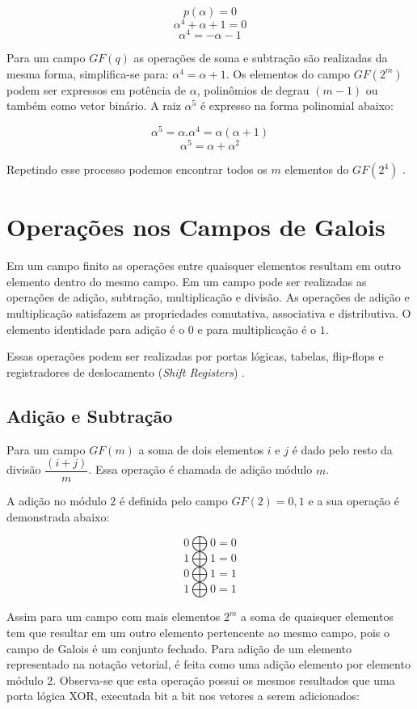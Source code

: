 $$p(\alpha) = 0$$
$$\alpha^{4} + \alpha + 1 = 0$$
$$\alpha^{4} = - \alpha - 1 $$

Para um campo $GF(q)$ as operações de soma e subtração são realizadas da mesma forma, simplifica-se para: $\alpha^{4} = \alpha + 1$. Os elementos do campo $GF(2^{m})$ podem ser expressos em potência de $\alpha$, polinômios de degrau $(m - 1)$ ou também como vetor binário. A raiz $\alpha^{5}$ é expresso na forma polinomial abaixo:

$$\alpha^{5} = \alpha.\alpha^{4} = \alpha(\alpha + 1)$$
$$\alpha^{5} = \alpha + \alpha^{2}$$

Repetindo esse processo podemos encontrar todos os $m$ elementos do $GF(2^{4})$ \cite{John2004}. 

\section{Operações nos Campos de Galois}

Em um campo finito as operações entre quaisquer elementos resultam em outro elemento dentro do mesmo campo. Em um campo pode ser realizadas as operações de adição, subtração, multiplicação e divisão. As operações de adição e multiplicação satisfazem as propriedades comutativa, associativa e distributiva. O elemento identidade para adição é o $0$ e para multiplicação é o $1$.

Essas operações podem ser realizadas por portas lógicas, tabelas, flip-flops e registradores de deslocamento (\textit{Shift Registers}) \cite{John2004}.

\subsection{Adição e Subtração}

Para um campo $GF(m)$ a soma de dois elementos $i$ e $j$ é dado pelo resto da divisão $\dfrac{(i + j)}{m}$. Essa operação é chamada de adição módulo $m$. 

A adição no módulo 2 é definida pelo campo $GF(2) = {0,1}$ e a sua operação é demonstrada abaixo:

$$0 \bigoplus 0 = 0$$
$$1 \bigoplus 1 = 0$$
$$0 \bigoplus 1 = 1$$
$$1 \bigoplus 0 = 1$$

Assim para um campo com mais elementos $2^{m}$ a soma de quaisquer elementos tem que resultar em um outro elemento pertencente ao mesmo campo, pois o campo de Galois é um conjunto fechado. Para adição de um elemento representado na notação vetorial, é feita como uma adição elemento por elemento módulo 2. Observa-se que esta operação possui os mesmos resultados que uma porta lógica XOR, executada bit a bit nos vetores a serem adicionados:

